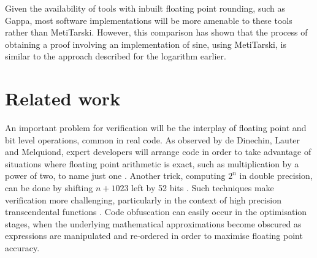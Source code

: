 \documentclass{fac}
\begin{document}
Given the availability of tools with inbuilt floating point rounding, such as Gappa, most software implementations will be more amenable to these tools rather than MetiTarski. However, this comparison has shown that the process of obtaining a proof involving an implementation of sine, using MetiTarski, is similar to the approach described for the logarithm earlier. 

\section{Related work}
\label{Related}
An important problem for verification will be the interplay of floating point and bit level operations, common in real code. As observed by de Dinechin, Lauter and Melquiond, expert developers will arrange code in order to take advantage of situations where floating point arithmetic is exact, such as multiplication by a power of two, to name just one \cite{de2006assisted}. Another trick, computing $2^n$ in double precision, can be done by shifting $n+1023$ left by 52 bits \cite{mine2012abstract}. Such techniques make verification more challenging, particularly in the context of high precision transcendental functions \cite{lee2016verifying}. Code obfuscation can easily occur in the optimisation stages, when the underlying mathematical approximations become obscured as expressions are manipulated and re-ordered in order to maximise floating point accuracy.
\end{document}
